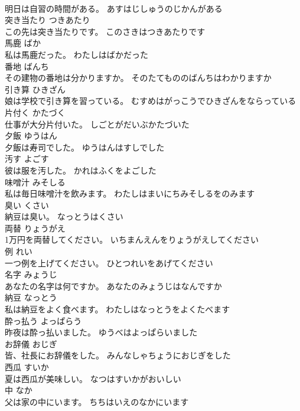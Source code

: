 \documentclass[8pt]{extreport}
\begin{document}
\begin{CJK}{UTF8}{min}
\\	明日は自習の時間がある。	あすはじしゅうのじかんがある	
\\	突き当たり	つきあたり	
\\	この先は突き当たりです。	このさきはつきあたりです	
\\	馬鹿	ばか	
\\	私は馬鹿だった。	わたしはばかだった	
\\	番地	ばんち	
\\	その建物の番地は分かりますか。	そのたてもののばんちはわかりますか	
\\	引き算	ひきざん	
\\	娘は学校で引き算を習っている。	むすめはがっこうでひきざんをならっている	
\\	片付く	かたづく	
\\	仕事が大分片付いた。	しごとがだいぶかたづいた	
\\	夕飯	ゆうはん	
\\	夕飯は寿司でした。	ゆうはんはすしでした	
\\	汚す	よごす	
\\	彼は服を汚した。	かれはふくをよごした	
\\	味噌汁	みそしる	
\\	私は毎日味噌汁を飲みます。	わたしはまいにちみそしるをのみます	
\\	臭い	くさい	
\\	納豆は臭い。	なっとうはくさい	
\\	両替	りょうがえ	
\\	1万円を両替してください。	いちまんえんをりょうがえしてください	
\\	例	れい	
\\	一つ例を上げてください。	ひとつれいをあげてください	
\\	名字	みょうじ	
\\	あなたの名字は何ですか。	あなたのみょうじはなんですか	
\\	納豆	なっとう	
\\	私は納豆をよく食べます。	わたしはなっとうをよくたべます	
\\	酔っ払う	よっぱらう	
\\	昨夜は酔っ払いました。	ゆうべはよっぱらいました	
\\	お辞儀	おじぎ	
\\	皆、社長にお辞儀をした。	みんなしゃちょうにおじぎをした	
\\	西瓜	すいか	
\\	夏は西瓜が美味しい。	なつはすいかがおいしい	
\\	中	なか	
\\	父は家の中にいます。	ちちはいえのなかにいます	

\end{CJK}
\end{document}
